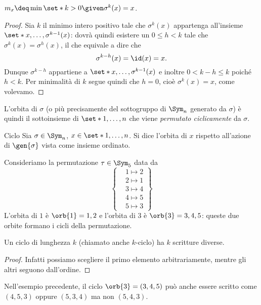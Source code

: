  $m_x \deq \min \set*{k > 0 \given \sigma^k(x) = x}$.
\begin{proof}
    Sia $k$ il minimo intero positivo tale che $\sigma^k(x)$ appartenga all'insieme $\set*{x, \dots, \sigma^{k-1}(x)}$: dovrà quindi esistere un $0 \leq h < k$ tale che $\sigma^k(x) = \sigma^h(x)$, il che equivale a dire che \[
        \sigma^{k-h}(x) = \id(x) = x.
    \] Dunque $\sigma^{k-h}$ appartiene a $\set*{x, \dots, \sigma^{k-1}(x)}$ e inoltre $0 < k - h \leq k$ poiché $h < k$. Per minimalità di $k$ segue quindi che $h = 0$, cioè $\sigma^k(x) = x$, come volevamo.  
\end{proof} 

L'orbita di $\sigma$ (o più precisamente del sottogruppo di $\Sym_n$ generato da $\sigma$) è quindi il sottoinsieme di $\set*{1, \dots, n}$ che viene \emph{permutato ciclicamente} da $\sigma$.

\begin{definition}
    {Ciclo}{}
    Sia $\sigma \in \Sym_n$, $x \in \set*{1, \dots, n}$. Si dice  l'orbita di $x$ rispetto all'azione di $\gen{\sigma}$ vista come insieme ordinato. 
\end{definition}

\begin{example}
    Consideriamo la permutazione $\tau \in \Sym_5$ data da \[
        \left\{
        \begin{aligned}
            &1 \mapsto 2 \\
            &2 \mapsto 1 \\
            &3 \mapsto 4 \\
            &4 \mapsto 5 \\
            &5 \mapsto 3
        \end{aligned}
        \right\}
    \] L'orbita di $1$ è $\orb{1} = {1, 2}$ e l'orbita di $3$ è $\orb{3} = {3, 4, 5}$: queste due orbite formano i cicli della permutazione.    
\end{example}

\begin{remark}
    Un ciclo di lunghezza $k$ (chiamato anche $k$-ciclo) ha $k$ scritture diverse.
    \begin{proof}
        Infatti possiamo scegliere il primo elemento arbitrariamente, mentre gli altri seguono dall'ordine.
    \end{proof}
\end{remark}

\begin{example}
    Nell'esempio precedente, il ciclo $\orb{3} = (3, 4, 5)$ può anche essere scritto come $(4, 5, 3)$ oppure $(5, 3, 4)$ ma non $(5, 4, 3)$.    
\end{example}


